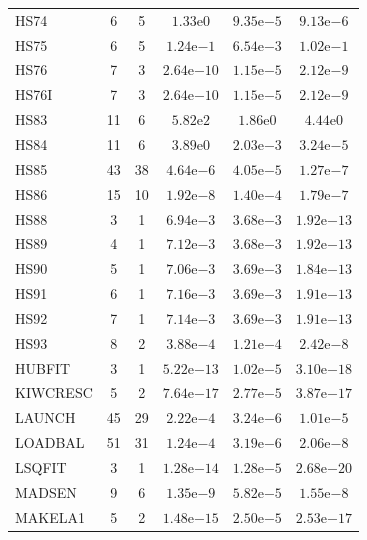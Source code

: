 \documentclass[11pt]{article}
\begin{document}
\begin{center}
\begin{longtable}{lccccc}
HS74 & 6 & 5 & $1.33\mathrm{e}{0}$ & $9.35\mathrm{e}{-5}$ & $9.13\mathrm{e}{-6}$ \\
HS75 & 6 & 5 & $1.24\mathrm{e}{-1}$ & $6.54\mathrm{e}{-3}$ & $1.02\mathrm{e}{-1}$ \\
HS76 & 7 & 3 & $2.64\mathrm{e}{-10}$ & $1.15\mathrm{e}{-5}$ & $2.12\mathrm{e}{-9}$ \\
HS76I & 7 & 3 & $2.64\mathrm{e}{-10}$ & $1.15\mathrm{e}{-5}$ & $2.12\mathrm{e}{-9}$ \\
HS83 & 11 & 6 & $5.82\mathrm{e}{2}$ & $1.86\mathrm{e}{0}$ & $4.44\mathrm{e}{0}$ \\
HS84 & 11 & 6 & $3.89\mathrm{e}{0}$ & $2.03\mathrm{e}{-3}$ & $3.24\mathrm{e}{-5}$ \\
HS85 & 43 & 38 & $4.64\mathrm{e}{-6}$ & $4.05\mathrm{e}{-5}$ & $1.27\mathrm{e}{-7}$ \\
HS86 & 15 & 10 & $1.92\mathrm{e}{-8}$ & $1.40\mathrm{e}{-4}$ & $1.79\mathrm{e}{-7}$ \\
HS88 & 3 & 1 & $6.94\mathrm{e}{-3}$ & $3.68\mathrm{e}{-3}$ & $1.92\mathrm{e}{-13}$ \\
HS89 & 4 & 1 & $7.12\mathrm{e}{-3}$ & $3.68\mathrm{e}{-3}$ & $1.92\mathrm{e}{-13}$ \\
HS90 & 5 & 1 & $7.06\mathrm{e}{-3}$ & $3.69\mathrm{e}{-3}$ & $1.84\mathrm{e}{-13}$ \\
HS91 & 6 & 1 & $7.16\mathrm{e}{-3}$ & $3.69\mathrm{e}{-3}$ & $1.91\mathrm{e}{-13}$ \\
HS92 & 7 & 1 & $7.14\mathrm{e}{-3}$ & $3.69\mathrm{e}{-3}$ & $1.91\mathrm{e}{-13}$ \\
HS93 & 8 & 2 & $3.88\mathrm{e}{-4}$ & $1.21\mathrm{e}{-4}$ & $2.42\mathrm{e}{-8}$ \\
HUBFIT & 3 & 1 & $5.22\mathrm{e}{-13}$ & $1.02\mathrm{e}{-5}$ & $3.10\mathrm{e}{-18}$ \\
KIWCRESC & 5 & 2 & $7.64\mathrm{e}{-17}$ & $2.77\mathrm{e}{-5}$ & $3.87\mathrm{e}{-17}$ \\
LAUNCH & 45 & 29 & $2.22\mathrm{e}{-4}$ & $3.24\mathrm{e}{-6}$ & $1.01\mathrm{e}{-5}$ \\
LOADBAL & 51 & 31 & $1.24\mathrm{e}{-4}$ & $3.19\mathrm{e}{-6}$ & $2.06\mathrm{e}{-8}$ \\
LSQFIT & 3 & 1 & $1.28\mathrm{e}{-14}$ & $1.28\mathrm{e}{-5}$ & $2.68\mathrm{e}{-20}$ \\
MADSEN & 9 & 6 & $1.35\mathrm{e}{-9}$ & $5.82\mathrm{e}{-5}$ & $1.55\mathrm{e}{-8}$ \\
MAKELA1 & 5 & 2 & $1.48\mathrm{e}{-15}$ & $2.50\mathrm{e}{-5}$ & $2.53\mathrm{e}{-17}$ \\

\end{longtable}
\end{center}
\end{document}
